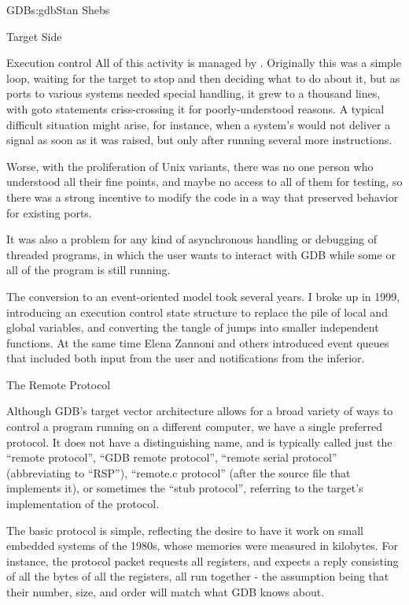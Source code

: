 \begin{aosachapter}{GDB}{s:gdb}{Stan Shebs}
\begin{aosasect1}{Target Side}
\begin{aosasect2}{Execution control}
All of this activity is managed by .
Originally this was a simple loop, waiting for the target to stop and
then deciding what to do about it, but as ports to various systems
needed special handling, it grew to a thousand lines, with goto
statements criss-crossing it for poorly-understood reasons.  A typical
difficult situation might arise, for instance, when a system's
 would not deliver a signal as soon as it was raised, but
only after running several more instructions.

Worse, with the proliferation of Unix variants, there was no one
person who understood all their fine points, and maybe no access to
all of them for testing, so there was a strong incentive to modify the
code in a way that preserved behavior for existing ports.

It was also a problem for any kind of asynchronous handling or
debugging of threaded programs, in which the user wants to interact
with GDB while some or all of the program is still running.

The conversion to an event-oriented model took several years.  I broke
up  in 1999, introducing an execution control state
structure to replace the pile of local and global variables, and
converting the tangle of jumps into smaller independent functions.  At
the same time Elena Zannoni and others introduced event queues that
included both input from the user and notifications from the inferior.

\end{aosasect2}

\begin{aosasect2}{The Remote Protocol}

Although GDB's target vector architecture allows for a broad variety
of ways to control a program running on a different computer, we have
a single preferred protocol.  It does not have a distinguishing name,
and is typically called just the ``remote protocol'', ``GDB remote
protocol'', ``remote serial protocol'' (abbreviating to ``RSP''),
``remote.c protocol'' (after the source file that implements it), or
sometimes the ``stub protocol'', referring to the target's
implementation of the protocol.

The basic protocol is simple, reflecting the desire to have it work on
small embedded systems of the 1980s, whose memories were measured in
kilobytes.  For instance, the protocol packet  requests all
registers, and expects a reply consisting of all the bytes of all the
registers, all run together - the assumption being that their number,
size, and order will match what GDB knows about.


\end{aosasect2}
\end{aosasect1}
\end{aosachapter}
